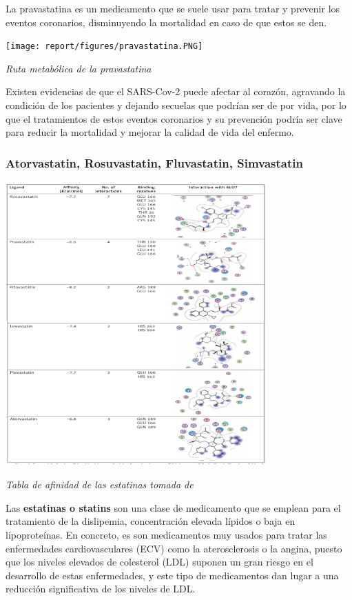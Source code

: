 La pravastatina es un medicamento que se suele usar para tratar y prevenir los eventos coronarios, disminuyendo la mortalidad en caso de que estos se den.


\begin{center}

\texttt{[image: report/figures/pravastatina.PNG]}

\caption{\textit{Ruta metabólica de la pravastatina }}

\end{center}

 Existen evidencias de que el SARS-Cov-2 puede afectar al corazón\cite{Oudit2009SARS-coronavirusSARS}, agravando la condición de los pacientes y dejando secuelas que podrían ser
 de por vida, por lo que el tratamientos de estos eventos coronarios y su prevención podría ser clave para reducir la mortalidad y mejorar la calidad de vida del enfermo.

\subsubsection{Atorvastatin, Rosuvastatin, Fluvastatin, Simvastatin}

\begin{center}
\includegraphics[width=100mm,scale=1]{report/figures/statins.PNG}


\caption{\textit{Tabla de afinidad de las estatinas tomada de \cite{Reiner2020StatinsInteraction} }}
\end{center}

Las \textbf{estatinas o statins} son una clase de medicamento que se emplean para el tratamiento de la dislipemia, concentración elevada lípidos o baja en lipoproteínas. En
concreto, es son medicamentos muy usados para tratar las enfermedades cardiovasculares (ECV) como la aterosclerosis o la angina, puesto que los niveles elevados de colesterol
(LDL) suponen un gran riesgo en el desarrollo de estas enfermedades, y este tipo de medicamentos dan lugar a una reducción significativa  de los niveles de LDL.


